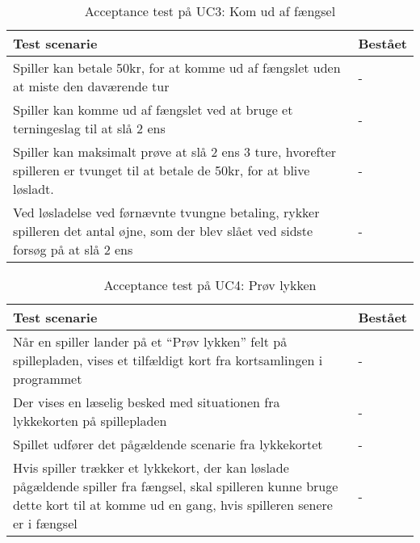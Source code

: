 \documentclass[class=article, crop=false]{standalone}
\begin{document}
    \begin{table}[H]
        \caption{Acceptance test på UC3: Kom ud af fængsel}
        \begin{tabularx}{\textwidth}{|X|l|}
            \hline
            \textbf{Test scenarie}       & \textbf{Bestået}   \\ \hline
            Spiller kan betale 50kr, for at komme ud af fængslet uden at miste den daværende tur & - \\ \hline
            Spiller kan komme ud af fængslet ved at bruge et terningeslag til at slå 2 ens& - \\ \hline
            Spiller kan maksimalt prøve at slå 2 ens 3 ture, hvorefter spilleren er tvunget til at betale de 50kr, for at blive løsladt. & -  \\ \hline
            Ved løsladelse ved førnævnte tvungne betaling, rykker spilleren det antal øjne, som der blev slået ved sidste forsøg på at slå 2 ens  & - \\ \hline
        \end{tabularx}
    \end{table}

    \begin{table}[H]
        \caption{Acceptance test på UC4: Prøv lykken}
        \begin{tabularx}{\textwidth}{|X|l|}
            \hline
            \textbf{Test scenarie}       & \textbf{Bestået}   \\ \hline
            Når en spiller lander på et “Prøv lykken” felt på spillepladen, vises et tilfældigt kort fra kortsamlingen i programmet & - \\ \hline
            Der vises en læselig besked med situationen fra lykkekorten på spillepladen & - \\ \hline
            Spillet udfører det pågældende scenarie fra lykkekortet  & -  \\ \hline
            Hvis spiller trækker et lykkekort, der kan løslade pågældende spiller fra fængsel, skal spilleren kunne bruge dette kort til at komme ud en gang, hvis spilleren senere er i fængsel  & - \\ \hline
        \end{tabularx}
    \end{table}
\end{document}
